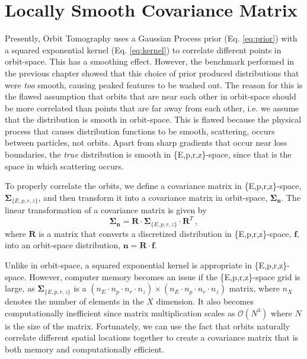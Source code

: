 \section{Locally Smooth Covariance Matrix}
Presently, Orbit Tomography uses a Gaussian Process prior (Eq. \ref{eq:prior}) with a squared exponential kernel (Eq. \ref{eq:kernel}) to correlate different points in orbit-space. This has a smoothing effect. However, the benchmark performed in the previous chapter showed that this choice of prior produced distributions that were \emph{too} smooth, causing peaked features to be washed out. The reason for this is the flawed assumption that orbits that are near each other in orbit-space should be more correlated than points that are far away from each other, i.e. we assume that the distribution is smooth in orbit-space. This is flawed because the physical process that causes distribution functions to be smooth, scattering, occurs between particles, not orbits. Apart from sharp gradients that occur near loss boundaries, the \emph{true} distribution is smooth in \{E,p,r,z\}-space, since that is the space in which scattering occurs. 

To properly correlate the orbits, we define a covariance matrix in \{E,p,r,z\}-space, $\mathbf{\Sigma}_{\{E,p,r,z\}}$, and then transform it into a covariance matrix in orbit-space, $\mathbf{\Sigma_n}$.
The linear transformation of a covariance matrix is given by
\begin{equation}\label{eq:transform_covariance}
    \mathbf{\Sigma_n} = \mathbf{R} \cdot \mathbf{\Sigma}_{\{E,p,r,z\}} \cdot \mathbf{R}^T\,,
\end{equation}
where $\mathbf{R}$ is a matrix that converts a discretized distribution in \{E,p,r,z\}-space, $\mathbf{f}$, into an orbit-space distribution, $\mathbf{n} = \mathbf{R} \cdot \mathbf{f}$.

Unlike in orbit-space, a squared exponential kernel is appropriate in \{E,p,r,z\}-space. However, computer memory becomes an issue if the \{E,p,r,z\}-space grid is large, as $\mathbf{\Sigma}_{\{E,p,r,z\}}$ is a $(n_E \cdot n_p \cdot n_r \cdot n_z) \times (n_E \cdot n_p \cdot n_r \cdot n_z)$ matrix, where $n_X$ denotes the number of elements in the $X$ dimension. It also becomes computationally inefficient since matrix multiplication scales as $\mathcal{O}(N^3)$ where $N$ is the size of the matrix. 
Fortunately, we can use the fact that orbits naturally correlate different spatial locations together to create a covariance matrix that is both memory and computationally efficient.

